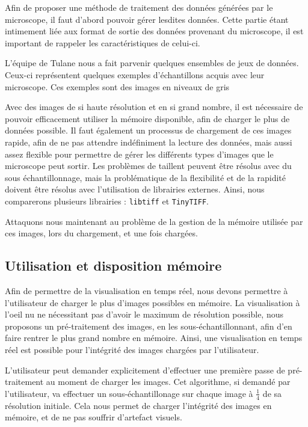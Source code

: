 {{		Afin de proposer une méthode de traitement des données générées par le microscope, il faut d'abord pouvoir gérer lesdites données. Cette partie étant intimement liée aux format de sortie des données provenant du microscope, il est important de rappeler les caractéristiques de celui-ci.\par

		L'équipe de Tulane nous a fait parvenir quelques ensembles de jeux de données. Ceux-ci représentent quelques exemples d'échantillons acquis avec leur microscope. Ces exemples sont des images en niveaux de gris \par

		Avec des images de si haute résolution et en si grand nombre, il est nécessaire de pouvoir efficacement utiliser la mémoire disponible, afin de charger le plus de données possible. Il faut également un processus de chargement de ces images rapide, afin de ne pas attendre indéfiniment la lecture des données, mais aussi assez flexible pour permettre de gérer les différents types d'images que le microscope peut sortir. Les problèmes de taillent peuvent être résolus avec du sous échantillonnage, mais la problématique de la flexibilité et de la rapidité doivent être résolus avec l'utilisation de librairies externes. Ainsi, nous comparerons plusieurs librairies : \texttt{libtiff} et \texttt{TinyTIFF}.\par

		\par

		Attaquons nous maintenant au problème de la gestion de la mémoire utilisée par ces images, lors du chargement, et une fois chargées.

		\subsection{Utilisation et disposition mémoire}
		{
			Afin de permettre de la visualisation en temps réel, nous devons permettre à l'utilisateur de charger le plus d'images possibles en mémoire. La visualisation à l'oeil nu ne nécessitant pas d'avoir le maximum de résolution possible, nous proposons un pré-traitement des images, en les sous-échantillonnant, afin d'en faire rentrer le plus grand nombre en mémoire. Ainsi, une visualisation en temps réel est possible pour l'intégrité des images chargées par l'utilisateur.\par
			L'utilisateur peut demander explicitement d'effectuer une première passe de pré-traitement au moment de charger les images. Cet algorithme, si demandé par l'utilisateur, va effectuer un sous-échantillonage sur chaque image à $\frac{1}{4}$ de sa résolution initiale. Cela nous permet de charger l'intégrité des images en mémoire, et de ne pas souffrir d'artefact visuels.\par

}}}
